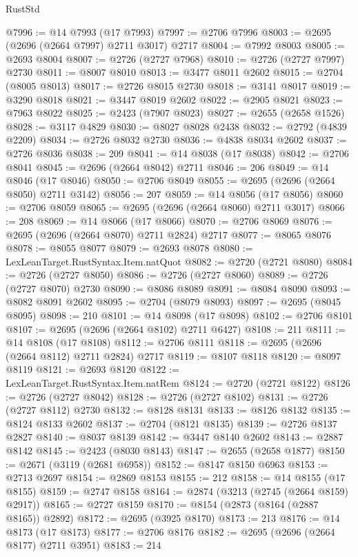 \begin{lexlean}{RustStd}
\begin{coremodule}
@7996 := @14 @7993 (@17 @7993)
@7997 := @2706 @7996
@8003 := @2695 (@2696 (@2664 @7997) @2711 @3017) @2717
@8004 := @7992 @8003
@8005 := @2693 @8004
@8007 := @2726 (@2727 @7968)
@8010 := @2726 (@2727 @7997) @2730
@8011 := @8007 @8010
@8013 := @3477 @8011 @2602
@8015 := @2704 (@8005 @8013)
@8017 := @2726 @8015 @2730
@8018 := @3141 @8017
@8019 := @3290 @8018
@8021 := @3447 @8019 @2602
@8022 := @2905 @8021
@8023 := @7963 @8022
@8025 := @2423 (@7907 @8023)
@8027 := @2655 (@2658 @1526)
@8028 := @3117 @4829
@8030 := @8027 @8028 @2438
@8032 := @2792 (@4839 @2209)
@8034 := @2726 @8032 @2730
@8036 := @4838 @8034 @2602
@8037 := @2726 @8036
@8038 := 209
@8041 := @14 @8038 (@17 @8038)
@8042 := @2706 @8041
@8045 := @2696 (@2664 @8042) @2711
@8046 := 206
@8049 := @14 @8046 (@17 @8046)
@8050 := @2706 @8049
@8055 := @2695 (@2696 (@2664 @8050) @2711 @3142)
@8056 := 207
@8059 := @14 @8056 (@17 @8056)
@8060 := @2706 @8059
@8065 := @2695 (@2696 (@2664 @8060) @2711 @3017)
@8066 := 208
@8069 := @14 @8066 (@17 @8066)
@8070 := @2706 @8069
@8076 := @2695 (@2696 (@2664 @8070) @2711 @2824) @2717
@8077 := @8065 @8076
@8078 := @8055 @8077
@8079 := @2693 @8078
@8080 := LexLeanTarget.RustSyntax.Item.natQuot
@8082 := @2720 (@2721 @8080)
@8084 := @2726 (@2727 @8050)
@8086 := @2726 (@2727 @8060)
@8089 := @2726 (@2727 @8070) @2730
@8090 := @8086 @8089
@8091 := @8084 @8090
@8093 := @8082 @8091 @2602
@8095 := @2704 (@8079 @8093)
@8097 := @2695 (@8045 @8095)
@8098 := 210
@8101 := @14 @8098 (@17 @8098)
@8102 := @2706 @8101
@8107 := @2695 (@2696 (@2664 @8102) @2711 @6427)
@8108 := 211
@8111 := @14 @8108 (@17 @8108)
@8112 := @2706 @8111
@8118 := @2695 (@2696 (@2664 @8112) @2711 @2824) @2717
@8119 := @8107 @8118
@8120 := @8097 @8119
@8121 := @2693 @8120
@8122 := LexLeanTarget.RustSyntax.Item.natRem
@8124 := @2720 (@2721 @8122)
@8126 := @2726 (@2727 @8042)
@8128 := @2726 (@2727 @8102)
@8131 := @2726 (@2727 @8112) @2730
@8132 := @8128 @8131
@8133 := @8126 @8132
@8135 := @8124 @8133 @2602
@8137 := @2704 (@8121 @8135)
@8139 := @2726 @8137 @2827
@8140 := @8037 @8139
@8142 := @3447 @8140 @2602
@8143 := @2887 @8142
@8145 := @2423 (@8030 @8143)
@8147 := @2655 (@2658 @1877)
@8150 := @2671 (@3119 (@2681 @6958))
@8152 := @8147 @8150 @6963
@8153 := @2713 @2697
@8154 := @2869 @8153
@8155 := 212
@8158 := @14 @8155 (@17 @8155)
@8159 := @2747 @8158
@8164 := @2874 (@3213 (@2745 (@2664 @8159) @2917))
@8165 := @2727 @8159
@8170 := @8154 (@2873 (@8164 (@2887 @8165)) @2892)
@8172 := @2695 (@3925 @8170)
@8173 := 213
@8176 := @14 @8173 (@17 @8173)
@8177 := @2706 @8176
@8182 := @2695 (@2696 (@2664 @8177) @2711 @3951)
@8183 := 214

\end{coremodule}
\end{lexlean}
